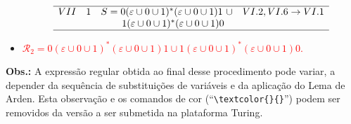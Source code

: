 \documentclass[12pt]{article}
\begin{document}
\begin{itemize}
{$$\begin{array}{ccll}
  \hline
  VII & 1 & S = 0(\varepsilon \cup 0 \cup 1)^*(\varepsilon \cup 0 \cup 1)1\ \cup & VI.2, VI.6 \rightarrow VI.1\\
      &   & \phantom{ A =}\ 1(\varepsilon \cup 0 \cup 1)^*(\varepsilon \cup 0 \cup 1)0\\
  \hline
  \end{array}
  $$
  }
  \item  \textcolor{red}{$\mathcal{R}_2 = 0(\varepsilon \cup 0 \cup 1)^*(\varepsilon \cup 0 \cup 1)1 \cup 1(\varepsilon \cup 0 \cup 1)^*(\varepsilon \cup 0 \cup 1)0$.}
\end{itemize}
%

\noindent\textbf{Obs.:} A expressão regular obtida ao final desse procedimento pode variar, a depender da sequência de substituições de variáveis e da aplicação do Lema de Arden. Esta observação e os comandos de cor (``\verb|\textcolor{}{}|'') podem ser removidos da versão a ser submetida na plataforma Turing.
\end{document}
